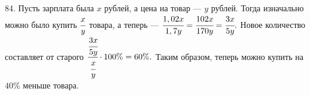 84. Пусть зарплата была $x$ рублей, а цена на товар --- $y$ рублей. Тогда изначально можно было купить $\cfrac{x}{y}$ товара, а теперь --- $\cfrac{1,02x}{1,7y}=\cfrac{102x}{170y}=\cfrac{3x}{5y}.$ Новое количество составляет от старого $\cfrac{\cfrac{3x}{5y}}{\cfrac{x}{y}}\cdot 100\%=60\%.$ Таким образом, теперь можно купить на $40\%$ меньше товара.\\
